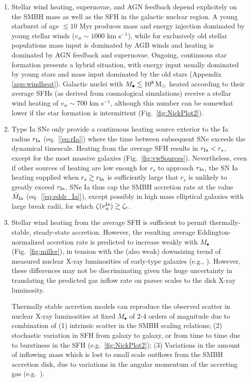 \documentclass[usenatbib,fleqn]{mn2e}
\newcommand{\rs}{r_s}
\newcommand{\Mbh}[1][]{M_{\bullet#1}}
\newcommand{\rIa}{r_{\rm Ia}}
\begin{document}
\begin{enumerate}
\item Stellar wind heating, supernovae, and AGN feedback depend explicitely on the SMBH mass as well as the SFH in the galactic nuclear region.  A young starburst of age $\lesssim 10$ Myr produces mass and energy injection dominated by young stellar winds ($v_w \sim 1000$ km s$^{-1}$), while for exclusively old stellar populations  mass input is dominated by AGB winds and heating is dominated by AGN feedback and supernovae.  Ongoing, continuous star formation presents a hybrid situation, with energy input usually dominated by young stars and mass input dominated by the old stars (Appendix \ref{app:windheat}).  Galactic nuclei with $\Mbh \lesssim 10^8\Msun$ heated according to their average SFHs (as derived from cosmological simulations) receive a stellar wind heating of $v_w \sim 700$ km s$^{-1}$, although this number can be somewhat lower if the star formation is intermittent (Fig.~\ref{fig:NickPlot2}).

\item Type Ia SNe only provide a continuous heating source exterior to the Ia radius $\rIa$ (eq.~[\ref{eq:rIa}]) where the time between subsequent SNe exceeds the dynamical timescale.  Heating from the average SFH results in $\rIa < \rs$, except for the most massive galaxies (Fig.~\ref{fig:vwSources}).  Nevertheless, even if other sources of heating are low enough for $\rs$ to approach $\rIa$, the SN Ia heating supplied when $\rs \gtrsim \rIa$ is sufficiently large that $\rs$ is unlikely to greatly exceed $\rIa$.  SNe Ia thus cap the SMBH accretion rate at the value $\dot{M}_{\rm Ia}$ (eq.~[\ref{eq:eddr_Ia}]), except possibly in high mass elliptical galaxies with large break radii, for which $\zeta(v_w^{\rm Ia}) \gtrsim \zeta_c$. 

\item Stellar wind heating from the average SFH is sufficient to permit thermally-stable, steady-state accretion.  However, the resulting average Eddington-normalized accretion rate is predicted to increase weakly with $M_{\bullet}$ (Fig.~\ref{fig:miller}), in tension with the (also weak) downsizing trend of measured nuclear X-ray luminosities of early-type galaxies (e.g., \citealt{Miller+15}).  However, these differences may not be discriminating given the huge uncertainty in translating the predicted gas inflow rate on parsec scales to the disk X-ray luminosity.

Thermally stable accretion models can reproduce the observed scatter in nuclear X-ray luminosities at fixed $\Mbh$ of 2-4 orders of magnitude due to combination of (1) intrinsic scatter in the SMBH scaling relations; (2) stochastic variation in SFH from galaxy to galaxy, or from time to time due to burstiness in the SFH (e.g.~\ref{fig:NickPlot2}); (3) Variations in the amount of inflowing mass which is lost to small scale outflows from the SMBH accretion disk, due to variations in the angular momentum of the accreting gas (e.g.~\citealt{Li+13}).


\end{enumerate}
\end{document}
